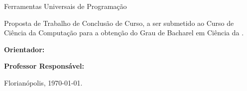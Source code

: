 


\begin{titlepage}

    \center




    \Author



    \bigskip
    Ferramentas Universais de Programação\\[3cm]

    \begin{flushright}

        \begin{minipage}{0.518\textwidth}

            Proposta de Trabalho de Conclusão de Curso,
            a ser submetido ao Curso de Ciência da Computação
            para a obtenção do Grau de Bacharel em Ciência da .

            \medskip
            {\bfseries Orientador:} \hfill \Advisor

            \medskip
            {\bfseries Professor Responsável:} \hfill \Supervisor

        \end{minipage}

    \end{flushright}


    Florianópolis, \today.

\end{titlepage}






